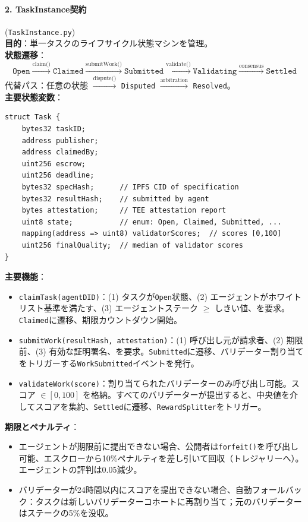 \documentclass[11pt]{article}
\begin{document}
\paragraph{2. TaskInstance契約} (\texttt{TaskInstance.py})\\
\textbf{目的}：単一タスクのライフサイクル状態マシンを管理。\\
\textbf{状態遷移}：
\begin{equation}
\texttt{Open} \xrightarrow{\text{claim()}} \texttt{Claimed} \xrightarrow{\text{submitWork()}} \texttt{Submitted} \xrightarrow{\text{validate()}} \texttt{Validating} \xrightarrow{\text{consensus}} \texttt{Settled}
\end{equation}
代替パス：任意の状態 $\xrightarrow{\text{dispute()}}$ \texttt{Disputed} $\xrightarrow{\text{arbitration}}$ \texttt{Resolved}。\\
\textbf{主要状態変数}：
\begin{verbatim}
struct Task {
    bytes32 taskID;
    address publisher;
    address claimedBy;
    uint256 escrow;
    uint256 deadline;
    bytes32 specHash;      // IPFS CID of specification
    bytes32 resultHash;    // submitted by agent
    bytes attestation;     // TEE attestation report
    uint8 state;           // enum: Open, Claimed, Submitted, ...
    mapping(address => uint8) validatorScores;  // scores [0,100]
    uint256 finalQuality;  // median of validator scores
}
\end{verbatim}
\textbf{主要機能}：
\begin{itemize}[noitemsep]
  \item \texttt{claimTask(agentDID)}：(1) タスクが\texttt{Open}状態、(2) エージェントがホワイトリスト基準を満たす、(3) エージェントステーク $\geq$ しきい値、を要求。\texttt{Claimed}に遷移、期限カウントダウン開始。
  \item \texttt{submitWork(resultHash, attestation)}：(1) 呼び出し元が請求者、(2) 期限前、(3) 有効な証明署名、を要求。\texttt{Submitted}に遷移、バリデーター割り当てをトリガーする\texttt{WorkSubmitted}イベントを発行。
  \item \texttt{validateWork(score)}：割り当てられたバリデーターのみ呼び出し可能。スコア $\in [0,100]$ を格納。すべてのバリデーターが提出すると、中央値を介してスコアを集約、\texttt{Settled}に遷移、\texttt{RewardSplitter}をトリガー。
\end{itemize}
\textbf{期限とペナルティ}：
\begin{itemize}[noitemsep]
  \item エージェントが期限前に提出できない場合、公開者は\texttt{forfeit()}を呼び出し可能、エスクローから10\%ペナルティを差し引いて回収（トレジャリーへ）。エージェントの評判は0.05減少。
  \item バリデーターが24時間以内にスコアを提出できない場合、自動フォールバック：タスクは新しいバリデーターコホートに再割り当て；元のバリデーターはステークの5\%を没収。
\end{itemize}
\end{document}

